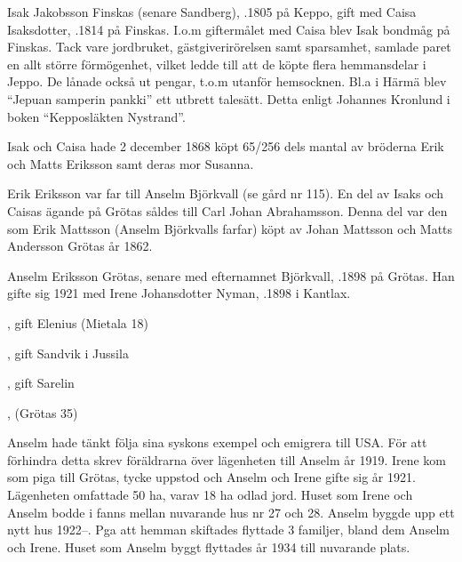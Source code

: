 Isak Jakobsson Finskas (senare Sandberg), .1805 på Keppo, gift med Caisa Isaksdotter, .1814 på Finskas. I.o.m giftermålet med Caisa blev Isak bondmåg på Finskas. Tack vare jordbruket, gästgiverirörelsen samt sparsamhet, samlade paret en allt större förmögenhet, vilket ledde till att de köpte flera hemmansdelar i Jeppo. De lånade också ut pengar, t.o.m utanför hemsocknen. Bl.a i Härmä blev ``Jepuan samperin pankki'' ett utbrett talesätt. Detta enligt Johannes Kronlund i boken ``Kepposläkten Nystrand''.

Isak och Caisa hade 2 december 1868 köpt 65/256 dels mantal av bröderna Erik och Matts Eriksson samt deras mor Susanna.

Erik Eriksson var far till Anselm Björkvall (se gård nr 115). En del av Isaks och Caisas ägande på Grötas såldes till Carl Johan Abrahamsson. Denna del var den som Erik Mattsson (Anselm Björkvalls farfar) köpt av Johan Mattsson och Matts Andersson Grötas år 1862.




Anselm Eriksson Grötas, senare med efternamnet Björkvall, .1898 på Grötas. Han gifte sig 1921 med Irene Johansdotter Nyman, .1898 i Kantlax.
\begin{jhchildren}
  \item {}, gift Elenius (Mietala 18)
  \item {}, gift Sandvik i Jussila
  \item {}, gift Sarelin
  \item {}, (Grötas 35)
\end{jhchildren}
Anselm hade tänkt följa sina syskons exempel och emigrera till USA. För att förhindra detta skrev föräldrarna över lägenheten till Anselm år 1919. Irene kom som piga till Grötas, tycke uppstod och Anselm och Irene gifte sig år 1921. Lägenheten omfattade 50 ha, varav 18 ha odlad jord. Huset som Irene och Anselm bodde i fanns mellan nuvarande hus nr 27 och 28. Anselm byggde upp ett nytt hus 1922--. Pga att hemman skiftades flyttade 3 familjer, bland dem Anselm och Irene. Huset som Anselm byggt flyttades år 1934 till nuvarande plats.

